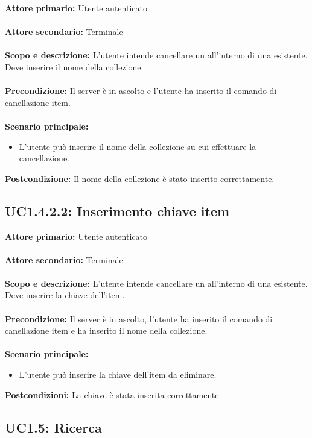 \documentclass{scalatekids-article}
\begin{document}
\textbf{Attore primario:} Utente autenticato\\ \\
\textbf{Attore secondario:} Terminale\\ \\
\textbf{Scopo e descrizione:} L'utente intende cancellare un  all'interno di una  esistente. Deve inserire il nome della collezione.\\ \\
\textbf{Precondizione:} Il server è in ascolto e l'utente ha inserito il comando di canellazione item.\\ \\
\textbf{Scenario principale:}
\begin{itemize}
  \item L'utente può inserire il nome della collezione su cui effettuare la cancellazione.
\end{itemize}
\textbf{Postcondizione:} Il nome della collezione è stato inserito correttamente.

\subsection{UC1.4.2.2: Inserimento chiave item}

\textbf{Attore primario:} Utente autenticato\\ \\
\textbf{Attore secondario:} Terminale\\ \\
\textbf{Scopo e descrizione:} L'utente intende cancellare un  all'interno di una  esistente. Deve inserire la chiave dell'item.\\ \\
\textbf{Precondizione:} Il server è in ascolto, l'utente ha inserito il comando di canellazione item e ha inserito il nome della collezione.\\ \\
\textbf{Scenario principale:}
\begin{itemize}
  \item L'utente può inserire la chiave dell'item da eliminare.
\end{itemize}
\textbf{Postcondizioni:} La chiave è stata inserita correttamente.

\subsection{UC1.5: Ricerca}
\end{document}
